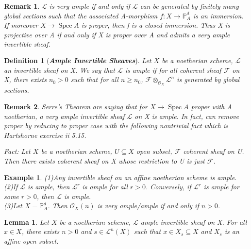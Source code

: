 \documentclass{ctexart}
\newtheorem{definition}{Definition}[section]
\newtheorem{remark}{Remark}[section]
\newtheorem{lemma}{Lemma}[section]
\newtheorem{example}{Example}[section]
\newcommand{\spec}{\operatorname{Spec}}
\begin{document}
\begin{remark}
    $\mathcal{L}$ is very ample if and only if $\mathcal{L}$ can be generated by finitely many global sections such that the associated A-morphism $f: X \longrightarrow \mathbb{P}_{A}^{d}$ is an immersion.
    If moreover $X \longrightarrow \spec A$ is proper, then f is a closed immersion.
    Thus X is projective over A if and only if X is proper over A and admits a very ample invertible sheaf.
\end{remark}
\begin{definition}[\textbf{\emph{Ample Invertible Sheaves}}]
    Let $X$ be a noetherian scheme, $\mathcal{L}$ an invertible sheaf on X.
    We say that $\mathcal{L}$ is ample if for all coherent sheaf $\mathcal{F}$ on X,
    there exists $n_{0} > 0$ such that for all $n \ge n_{0}$, $\mathcal{F} \otimes_{\mathcal{O}_{X}} \mathcal{L}^{n}$ is generated by global sections.
\end{definition}
\begin{remark}
    Serre's Theorem are saying that for $X \longrightarrow \spec A$ proper with A noetherian,
    a very ample invertible sheaf $\mathcal{L}$ on X is ample.
    In fact, can remove proper by reducing to proper case with the following nontrivial fact which is Hartshorne exercise ii 5.15.
    \par
    Fact: Let $X$ be a noetherian scheme, $U \subseteq X$ open subset, $\mathcal{F}$ coherent sheaf on U.
    Then there exists coherent sheaf on X whose restriction to U is just $\mathcal{F}$.
\end{remark}
\begin{example}
    (1)Any invertible sheaf on an affine noetherian scheme is ample. \\
    (2)If $\mathcal{L}$ is ample, then $\mathcal{L}^{r}$ is ample for all $r > 0$. 
    Conversely, if $\mathcal{L}^{r}$ is ample for some $r > 0$, then $\mathcal{L}$ is ample. \\
    (3)Let $X = \mathbb{P}_{A}^{d}$.
    Then $\mathcal{O}_{X}(n)$ is very ample/ample if and only if $n > 0$.
\end{example}
\begin{lemma}
    Let $X$ be a noetherian scheme, $\mathcal{L}$ ample invertible sheaf on X.
    For all $x\in X$, there exists $n > 0$ and $s\in \mathcal{L}^{n}(X)$ such that $x\in X_{s} \subseteq X$ and $X_{s}$ is an affine open subset.
    \label{Lemma 6.5}
\end{lemma}
\end{document}
